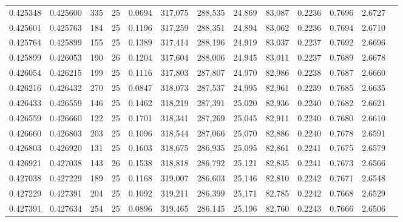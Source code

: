 \begin{tabular}{rrrrrrrrrrrrr}
0.425348 & 0.425600 &   335 &  25 &                                     0.0694 & 317,075 & 288,535 &  24,869 &  83,087 & 0.2236 & 0.7696 & 2.6727 \\
0.425601 & 0.425763 &   184 &  25 &                                     0.1196 & 317,259 & 288,351 &  24,894 &  83,062 & 0.2236 & 0.7694 & 2.6710 \\
0.425764 & 0.425899 &   155 &  25 &                                     0.1389 & 317,414 & 288,196 &  24,919 &  83,037 & 0.2237 & 0.7692 & 2.6696 \\
0.425899 & 0.426053 &   190 &  26 &                                     0.1204 & 317,604 & 288,006 &  24,945 &  83,011 & 0.2237 & 0.7689 & 2.6678 \\
0.426054 & 0.426215 &   199 &  25 &                                     0.1116 & 317,803 & 287,807 &  24,970 &  82,986 & 0.2238 & 0.7687 & 2.6660 \\
0.426216 & 0.426432 &   270 &  25 &                                     0.0847 & 318,073 & 287,537 &  24,995 &  82,961 & 0.2239 & 0.7685 & 2.6635 \\
0.426433 & 0.426559 &   146 &  25 &                                     0.1462 & 318,219 & 287,391 &  25,020 &  82,936 & 0.2240 & 0.7682 & 2.6621 \\
0.426559 & 0.426660 &   122 &  25 &                                     0.1701 & 318,341 & 287,269 &  25,045 &  82,911 & 0.2240 & 0.7680 & 2.6610 \\
0.426660 & 0.426803 &   203 &  25 &                                     0.1096 & 318,544 & 287,066 &  25,070 &  82,886 & 0.2240 & 0.7678 & 2.6591 \\
0.426803 & 0.426920 &   131 &  25 &                                     0.1603 & 318,675 & 286,935 &  25,095 &  82,861 & 0.2241 & 0.7675 & 2.6579 \\
0.426921 & 0.427038 &   143 &  26 &                                     0.1538 & 318,818 & 286,792 &  25,121 &  82,835 & 0.2241 & 0.7673 & 2.6566 \\
0.427038 & 0.427229 &   189 &  25 &                                     0.1168 & 319,007 & 286,603 &  25,146 &  82,810 & 0.2242 & 0.7671 & 2.6548 \\
0.427229 & 0.427391 &   204 &  25 &                                     0.1092 & 319,211 & 286,399 &  25,171 &  82,785 & 0.2242 & 0.7668 & 2.6529 \\
0.427391 & 0.427634 &   254 &  25 &                                     0.0896 & 319,465 & 286,145 &  25,196 &  82,760 & 0.2243 & 0.7666 & 2.6506 \\

\end{tabular}
